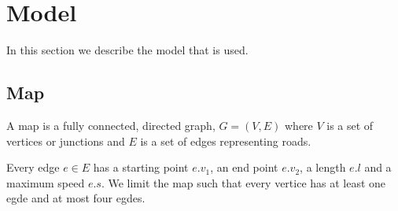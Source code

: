 \section{Model}
In this section we describe the model that is used.

\begin{comment}\\\\
\noindent\begin{tabular}{ll}
$\Sigma$ & alphabet\\
$\mathbb{R}$ & set of real numbers\\
$\mathbb{N}$ & set of natual numbers not including zero\\
$\mathbb{N}_0$ & set of natual numbers including zero
\end{tabular}
\end{comment}

\subsection{Map}
A map is a fully connected, directed graph, $G = (V, E)$ where $V$ is a set of vertices or junctions and $E$ is a set of edges representing roads.

Every edge $e\in E$ has a starting point $e.v_1$, an end point $e.v_2$, a length $e.l$ and a maximum speed $e.s$.
We limit the map such that every vertice has at least one egde and at most four egdes.

\begin{comment}
A map is fully connected, directed graph of vertices and edges, where edges, $E$, are annotered with a length, $l$, a maximum speed limit, $s$. The edge is directed from $v_1$ to $v_2$.
\begin{align}
\mathcal{V} &= \{v \mid v \in \Sigma^*\}\\
\mathcal{E} &= \{(v_1, v_2, l, s) \mid v_1, v_2 \in \mathcal{V}, l\in \mathbb{R}, s\in\mathbb{N}\}\\
\end{align}

With this, we can define a map as a pair of vertices and egdes.
\[
m = (V, E) \mid V\subseteq \mathcal{V}, E\subseteq \mathcal{E}
\]


We assume that
\begin{itemize}
\item Every edge has a length, maximum speed and at least one lane
\item Every vertice has at most four edges
\item Every vertice is has at least one edge
\item There is at least one connection for each egde
\item Egdes in connections are connected in $E$
\end{itemize}
\end{comment}

